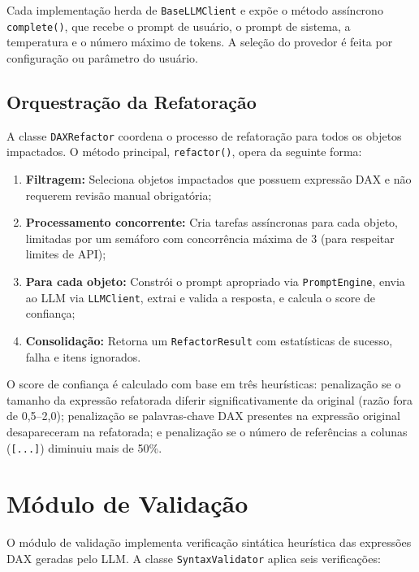 \documentclass[
    12pt,               %
    openright,          %
    oneside,            %
    a4paper,            %
    chapter=TITLE,      %
    section=TITLE,      %
    brazil              %
]{abntex2}
\begin{document}
Cada implementação herda de \texttt{BaseLLMClient} e expõe o método assíncrono \texttt{complete()}, que recebe o prompt de usuário, o prompt de sistema, a temperatura e o número máximo de tokens. A seleção do provedor é feita por configuração ou parâmetro do usuário.

\subsection{Orquestração da Refatoração}

A classe \texttt{DAXRefactor} coordena o processo de refatoração para todos os objetos impactados. O método principal, \texttt{refactor()}, opera da seguinte forma:

\begin{enumerate}
    \item \textbf{Filtragem:} Seleciona objetos impactados que possuem expressão DAX e não requerem revisão manual obrigatória;
    \item \textbf{Processamento concorrente:} Cria tarefas assíncronas para cada objeto, limitadas por um semáforo com concorrência máxima de 3 (para respeitar limites de API);
    \item \textbf{Para cada objeto:} Constrói o prompt apropriado via \texttt{PromptEngine}, envia ao LLM via \texttt{LLMClient}, extrai e valida a resposta, e calcula o score de confiança;
    \item \textbf{Consolidação:} Retorna um \texttt{RefactorResult} com estatísticas de sucesso, falha e itens ignorados.
\end{enumerate}

O score de confiança é calculado com base em três heurísticas: penalização se o tamanho da expressão refatorada diferir significativamente da original (razão fora de 0,5--2,0); penalização se palavras-chave DAX presentes na expressão original desapareceram na refatorada; e penalização se o número de referências a colunas (\texttt{[...]}) diminuiu mais de 50\%.

\section{Módulo de Validação}

O módulo de validação implementa verificação sintática heurística das expressões DAX geradas pelo LLM. A classe \texttt{SyntaxValidator} aplica seis verificações:
\end{document}
